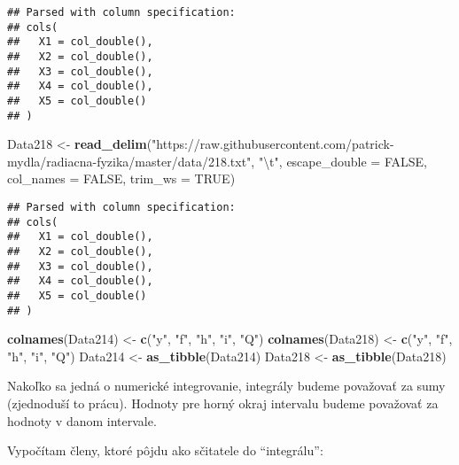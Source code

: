 \documentclass[]{article}
\newenvironment{Shaded}{\begin{snugshade}}{\end{snugshade}}
\newcommand{\CharTok}[1]{\textcolor[rgb]{0.31,0.60,0.02}{#1}}
\newcommand{\DataTypeTok}[1]{\textcolor[rgb]{0.13,0.29,0.53}{#1}}
\newcommand{\KeywordTok}[1]{\textcolor[rgb]{0.13,0.29,0.53}{\textbf{#1}}}
\newcommand{\NormalTok}[1]{#1}
\newcommand{\OtherTok}[1]{\textcolor[rgb]{0.56,0.35,0.01}{#1}}
\newcommand{\StringTok}[1]{\textcolor[rgb]{0.31,0.60,0.02}{#1}}
\begin{document}
\begin{verbatim}
## Parsed with column specification:
## cols(
##   X1 = col_double(),
##   X2 = col_double(),
##   X3 = col_double(),
##   X4 = col_double(),
##   X5 = col_double()
## )
\end{verbatim}

\begin{Shaded}
\begin{Highlighting}[]
\NormalTok{Data218 <-}\StringTok{ }\KeywordTok{read_delim}\NormalTok{(}\StringTok{"https://raw.githubusercontent.com/patrick-mydla/radiacna-fyzika/master/data/218.txt"}\NormalTok{, }
    \StringTok{"}\CharTok{\textbackslash{}t}\StringTok{"}\NormalTok{, }\DataTypeTok{escape_double =} \OtherTok{FALSE}\NormalTok{, }\DataTypeTok{col_names =} \OtherTok{FALSE}\NormalTok{, }
    \DataTypeTok{trim_ws =} \OtherTok{TRUE}\NormalTok{)}
\end{Highlighting}
\end{Shaded}

\begin{verbatim}
## Parsed with column specification:
## cols(
##   X1 = col_double(),
##   X2 = col_double(),
##   X3 = col_double(),
##   X4 = col_double(),
##   X5 = col_double()
## )
\end{verbatim}

\begin{Shaded}
\begin{Highlighting}[]
\KeywordTok{colnames}\NormalTok{(Data214) <-}\StringTok{ }\KeywordTok{c}\NormalTok{(}\StringTok{"y"}\NormalTok{, }\StringTok{"f"}\NormalTok{, }\StringTok{"h"}\NormalTok{, }\StringTok{"i"}\NormalTok{, }\StringTok{"Q"}\NormalTok{)}
\KeywordTok{colnames}\NormalTok{(Data218) <-}\StringTok{ }\KeywordTok{c}\NormalTok{(}\StringTok{"y"}\NormalTok{, }\StringTok{"f"}\NormalTok{, }\StringTok{"h"}\NormalTok{, }\StringTok{"i"}\NormalTok{, }\StringTok{"Q"}\NormalTok{)}
\NormalTok{Data214 <-}\StringTok{ }\KeywordTok{as_tibble}\NormalTok{(Data214)}
\NormalTok{Data218 <-}\StringTok{ }\KeywordTok{as_tibble}\NormalTok{(Data218)}
\end{Highlighting}
\end{Shaded}

Nakoľko sa jedná o numerické integrovanie, integrály budeme považovať za
sumy (zjednoduší to prácu). Hodnoty pre horný okraj intervalu budeme
považovať za hodnoty v danom intervale.

Vypočítam členy, ktoré pôjdu ako sčitatele do ``integrálu'':
\end{document}

